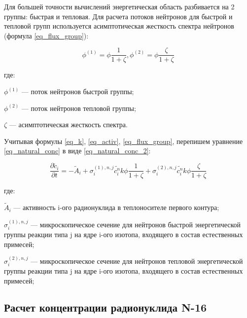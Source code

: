Для большей точности вычислений энергетическая область разбивается на 2 группы: быстрая и тепловая. Для расчета потоков 
нейтронов для быстрой и тепловой групп используется асимптотическая жесткость спектра нейтронов 
(формула \ref{eq_flux_group}):

\begin{equation}
    \label{eq_flux_group}
    \phi^{(1)} = \phi \frac{1}{1 + \zeta}, \phi^{(2)} = \phi \frac{\zeta}{1 + \zeta}
\end{equation}

где:
\begin{description}
    \item $\phi^{(1)}$ --- поток нейтронов быстрой группы;
    \item $\phi^{(2)}$ --- поток нейтронов тепловой группы;
    \item $\zeta$ --- асимптотическая жесткость спектра.
\end{description}

Учитывая формулы \ref{eq_k}, \ref{eq_activ}, \ref{eq_flux_group}, перепишем уравнение \ref{eq_natural_conc} в виде 
\ref{eq_natural_conc_2}:

\begin{equation}
    \label{eq_natural_conc_2}
    \frac{\partial \widetilde{c}_{i}}{\partial t} = -\widetilde{A}_{i} + \sigma_{i}^{(1), n,j} \widetilde{c_{i}^{n}}
        k \phi \frac{1}{1 + \zeta} + \sigma_{i}^{(2), n,j} \widetilde{c_{i}^{n}} k \phi \frac{\zeta}{1 + \zeta}
\end{equation}

где:
\begin{description}
    \item $\widetilde{A}_{i}$ --- активность i-ого радионуклида в теплоносителе первого контура;
    \item $\sigma_{i}^{(1), n,j}$ --- микроскопическое сечение для нейтронов быстрой энергетической группы реакции типа 
        j на ядре i-ого изотопа, входящего в состав естественных примесей;
    \item $\sigma_{i}^{(2), n,j}$ --- микроскопическое сечение для нейтронов тепловой энергетической группы реакции типа 
        j на ядре i-ого изотопа, входящего в состав естественных примесей; 
\end{description}

\subsection{Расчет концентрации радионуклида N-16}

